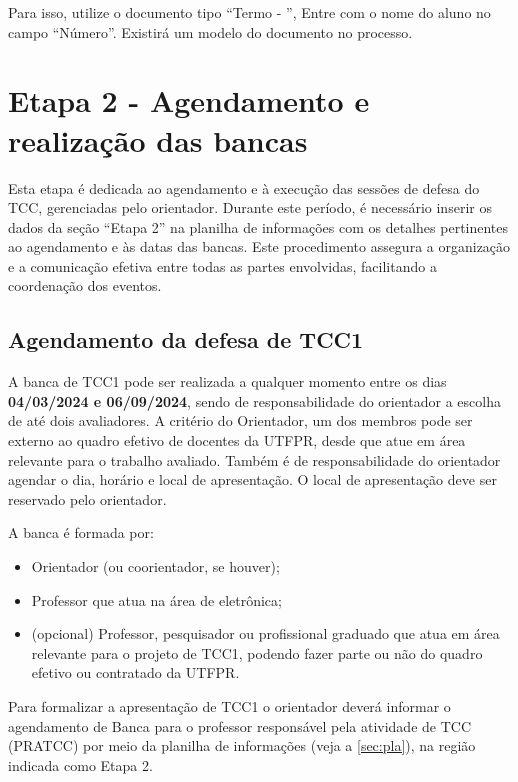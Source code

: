\documentclass[a4paper, 12pt]{article}
\newcommand{\startdate}{04/03/2024}		%
\newcommand{\bancadate}{06/09/2024}		%
\begin{document}
	Para isso, utilize o documento tipo ``Termo - '', Entre com o nome do aluno no campo ``Número''. Existirá um modelo do documento no processo.


    \section{Etapa 2 - Agendamento e realização das bancas}
	\label{sec:et2}

	Esta etapa é dedicada ao agendamento e à execução das sessões de defesa do TCC, gerenciadas pelo orientador. Durante este período, é necessário inserir os dados da seção ``Etapa 2'' na planilha de informações com os detalhes pertinentes ao agendamento e às datas das bancas. Este procedimento assegura a organização e a comunicação efetiva entre todas as partes envolvidas, facilitando a coordenação dos eventos.
   	
	\subsection{Agendamento da defesa de TCC1}

    A banca de TCC1 pode ser realizada a qualquer momento entre os dias \textbf{\startdate{} e \bancadate{}}, sendo de responsabilidade do orientador a escolha de até dois avaliadores. A critério do Orientador, um dos membros pode ser externo ao quadro efetivo de docentes da UTFPR, desde que atue em área relevante para o trabalho avaliado. Também é de responsabilidade do orientador agendar o dia, horário e local de apresentação. O local de apresentação deve ser reservado pelo orientador.

	A banca é formada por:

	\begin{itemize}
		\item Orientador (ou coorientador, se houver);
		\item Professor que atua na área de eletrônica;
		\item (opcional) Professor, pesquisador ou profissional graduado que atua em área relevante para o projeto de TCC1,  podendo fazer parte ou não do quadro efetivo ou contratado da UTFPR.
	\end{itemize}
    
    Para formalizar a apresentação de TCC1 o orientador deverá informar o agendamento de Banca para o professor responsável pela atividade de TCC (PRATCC) por meio da planilha de informações (veja a \autoref{sec:pla}), na região indicada como Etapa 2.
    
\end{document}
